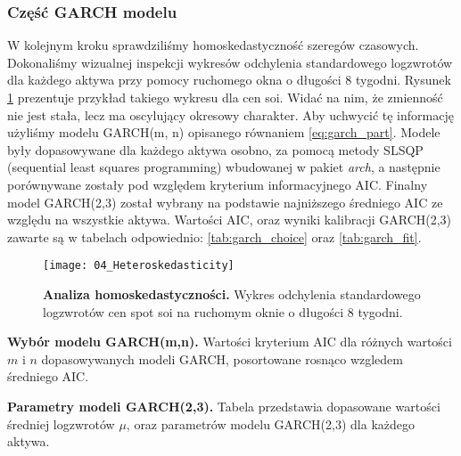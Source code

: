 \subsubsection{Część GARCH modelu}
W kolejnym kroku sprawdziliśmy homoskedastyczność szeregów czasowych. Dokonaliśmy wizualnej inspekcji wykresów odchylenia standardowego logzwrotów dla każdego aktywa przy pomocy ruchomego okna o długości $8$ tygodni. Rysunek \ref{fig:homoskedasticity} prezentuje przykład takiego wykresu dla cen soi. Widać na nim, że zmienność nie jest stała, lecz ma oscylujący okresowy charakter. Aby uchwycić tę informację użyliśmy modelu GARCH(m, n) opisanego równaniem \ref{eq:garch_part}. Modele były dopasowywane dla każdego aktywa osobno, za pomocą metody SLSQP (sequential least squares programming) wbudowanej w pakiet \emph{arch}, a następnie porównywane zostały pod względem kryterium informacyjnego AIC. Finalny model GARCH(2,3) został wybrany na podstawie najniższego średniego AIC ze względu na wszystkie aktywa. Wartości AIC, oraz wyniki kalibracji GARCH(2,3) zawarte są w tabelach odpowiednio: \ref{tab:garch_choice} oraz \ref{tab:garch_fit}.

\begin{figure}[h]
	\centering
	\texttt{[image: 04\_Heteroskedasticity]}
	\caption{\textbf{Analiza homoskedastyczności.} Wykres odchylenia standardowego logzwrotów cen spot soi na ruchomym oknie o długości 8 tygodni. \label{fig:homoskedasticity}}
\end{figure}

\begin{table}
	\centering
	
	\caption{\textbf{Wybór modelu GARCH(m,n).} Wartości kryterium AIC dla różnych wartości $m$ i $n$ dopasowywanych modeli GARCH, posortowane rosnąco wzgledem średniego AIC. \label{tab:garch_choice}}
\end{table}

\begin{table}
	\centering
	
	\caption{\textbf{Parametry modeli GARCH(2,3).} Tabela przedstawia dopasowane wartości średniej logzwrotów $\mu$, oraz parametrów modelu GARCH(2,3) dla każdego aktywa. \label{tab:garch_fit}}
\end{table}

